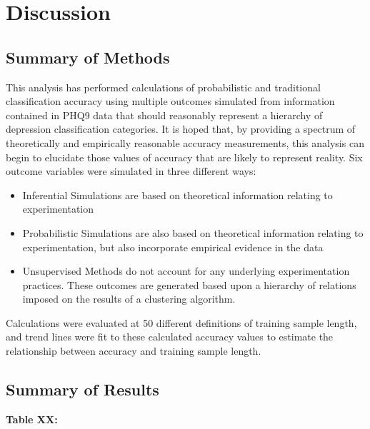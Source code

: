 \documentclass[12pt,]{article}
\providecommand{\tightlist}{%
  \setlength{\itemsep}{0pt}\setlength{\parskip}{0pt}}
\begin{document}
\hypertarget{discussion}{%
\section{Discussion}\label{discussion}}

\hypertarget{summary-of-methods}{%
\subsection{Summary of Methods}\label{summary-of-methods}}

This analysis has performed calculations of probabilistic and
traditional classification accuracy using multiple outcomes simulated
from information contained in PHQ9 data that should reasonably represent
a hierarchy of depression classification categories. It is hoped that,
by providing a spectrum of theoretically and empirically reasonable
accuracy measurements, this analysis can begin to elucidate those values
of accuracy that are likely to represent reality. Six outcome variables
were simulated in three different ways:

\begin{itemize}
\tightlist
\item
  Inferential Simulations are based on theoretical information relating
  to experimentation
\item
  Probabilistic Simulations are also based on theoretical information
  relating to experimentation, but also incorporate empirical evidence
  in the data
\item
  Unsupervised Methods do not account for any underlying experimentation
  practices. These outcomes are generated based upon a hierarchy of
  relations imposed on the results of a clustering algorithm.
\end{itemize}

Calculations were evaluated at 50 different definitions of training
sample length, and trend lines were fit to these calculated accuracy
values to estimate the relationship between accuracy and training sample
length.

\hypertarget{summary-of-results}{%
\subsection{Summary of Results}\label{summary-of-results}}

\textbf{Table XX:}
\end{document}

